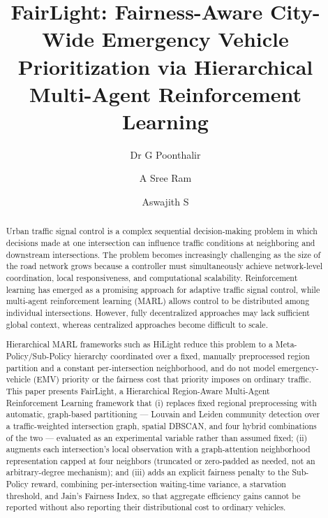 \documentclass[3p,times]{elsarticle}
\theoremstyle{plain}
\theoremstyle{definition}
\begin{document}
\begin{frontmatter}


\title{FairLight: Fairness-Aware City-Wide Emergency Vehicle
Prioritization via Hierarchical Multi-Agent Reinforcement Learning}

\author{Dr G Poonthalir}
\author{A Sree Ram}
\author{Aswajith S}




\begin{abstract}

Urban traffic signal control is a complex sequential decision-making
problem in which decisions made at one intersection can influence
traffic conditions at neighboring and downstream intersections. The
problem becomes increasingly challenging as the size of the road
network grows because a controller must simultaneously achieve
network-level coordination, local responsiveness, and computational
scalability. Reinforcement learning has emerged as a promising approach
for adaptive traffic signal control, while multi-agent reinforcement
learning (MARL) allows control to be distributed among individual
intersections. However, fully decentralized approaches may lack
sufficient global context, whereas centralized approaches become
difficult to scale.

Hierarchical MARL frameworks such as HiLight reduce this problem to a
Meta-Policy/Sub-Policy hierarchy coordinated over a fixed, manually
preprocessed region partition and a constant per-intersection
neighborhood, and do not model emergency-vehicle (EMV) priority or the
fairness cost that priority imposes on ordinary traffic. This paper
presents FairLight, a Hierarchical Region-Aware Multi-Agent
Reinforcement Learning framework that (i) replaces fixed regional
preprocessing with automatic, graph-based partitioning --- Louvain and
Leiden community detection over a traffic-weighted intersection graph,
spatial DBSCAN, and four hybrid combinations of the two --- evaluated
as an experimental variable rather than assumed fixed; (ii) augments
each intersection's local observation with a graph-attention
neighborhood representation capped at four neighbors (truncated or
zero-padded as needed, not an arbitrary-degree mechanism); and (iii)
adds an explicit fairness penalty to the Sub-Policy reward, combining
per-intersection waiting-time variance, a starvation threshold, and
Jain's Fairness Index, so that aggregate efficiency gains cannot be
reported without also reporting their distributional cost to ordinary
vehicles.


\end{abstract}
\end{frontmatter}
\end{document}
